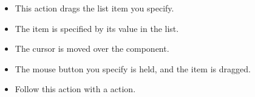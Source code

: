 
\begin{itemize}
\item This action drags the list item you specify.
\item The item is specified by its value in the list.
\item The cursor is moved over the component.
\item The mouse button you specify is held, and the item is dragged. 
\item Follow this action with a  action.
\end{itemize}

